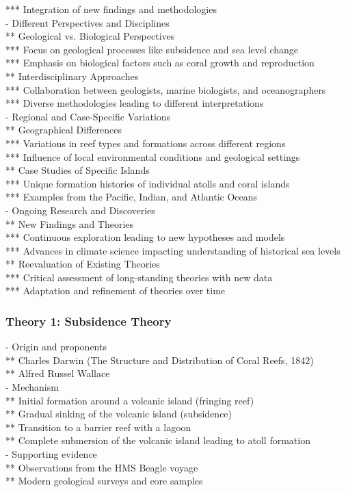 *** Integration of new findings and methodologies \\
- Different Perspectives and Disciplines \\
** Geological vs. Biological Perspectives \\
*** Focus on geological processes like subsidence and sea level change \\
*** Emphasis on biological factors such as coral growth and reproduction \\
** Interdisciplinary Approaches \\
*** Collaboration between geologists, marine biologists, and oceanographers \\
*** Diverse methodologies leading to different interpretations \\
- Regional and Case-Specific Variations \\
** Geographical Differences \\
*** Variations in reef types and formations across different regions \\
*** Influence of local environmental conditions and geological settings \\
** Case Studies of Specific Islands \\
*** Unique formation histories of individual atolls and coral islands \\
*** Examples from the Pacific, Indian, and Atlantic Oceans \\
- Ongoing Research and Discoveries \\
** New Findings and Theories \\
*** Continuous exploration leading to new hypotheses and models \\
*** Advances in climate science impacting understanding of historical sea levels \\
** Reevaluation of Existing Theories \\
*** Critical assessment of long-standing theories with new data \\
*** Adaptation and refinement of theories over time

\subsubsection{Theory 1: Subsidence Theory}
- Origin and proponents \\
** Charles Darwin (The Structure and Distribution of Coral Reefs, 1842) \\
** Alfred Russel Wallace \\
- Mechanism \\
** Initial formation around a volcanic island (fringing reef) \\
** Gradual sinking of the volcanic island (subsidence) \\
** Transition to a barrier reef with a lagoon \\
** Complete submersion of the volcanic island leading to atoll formation \\
- Supporting evidence \\
** Observations from the HMS Beagle voyage \\
** Modern geological surveys and core samples

